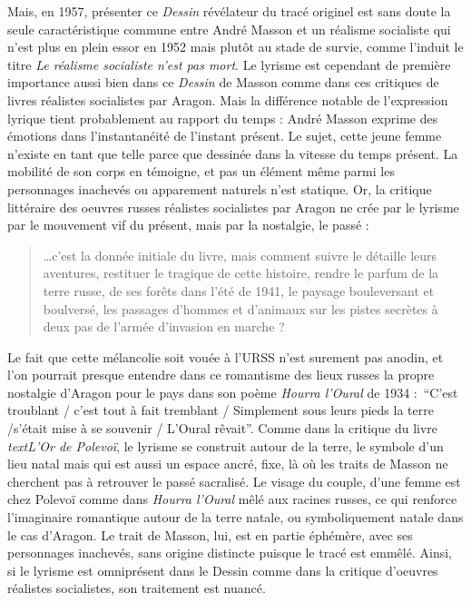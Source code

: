 	Mais, en 1957, présenter ce \emph{Dessin} révélateur du tracé originel est sans doute la seule caractéristique commune entre André Masson et un réalisme socialiste qui n’est plus en plein essor en 1952 mais plutôt au stade de survie, comme l’induit le titre \emph{Le réalisme socialiste n’est pas mort}. Le lyrisme est cependant de première importance aussi bien dans ce \emph{Dessin} de Masson comme dans ces critiques de livres réalistes socialistes par Aragon. Mais la différence notable de l’expression lyrique tient probablement au rapport du temps : André Masson exprime des émotions dans l’instantanéité de l’instant présent. Le sujet, cette jeune femme n’existe en tant que telle parce que dessinée dans la vitesse du temps présent. La mobilité de son corps en témoigne, et pas un élément même parmi les personnages inachevés ou apparement naturels n’est statique. Or, la critique littéraire des oeuvres russes réalistes socialistes par Aragon ne crée par le lyrisme par le mouvement vif du présent, mais par la nostalgie, le passé : 

\begin{quote}
…c’est la donnée initiale du livre, mais comment suivre le détaille leurs aventures, restituer le tragique de cette histoire, rendre le parfum de la terre russe, de ses forêts dans l’été de 1941, le paysage bouleversant et boulversé, les passages d’hommes et d’animaux sur les pistes secrètes à deux pas de l’armée d’invasion en marche ?  	
\end{quote}	


Le fait que cette mélancolie soit vouée à l’URSS n’est surement pas anodin, et l’on pourrait presque entendre dans ce romantisme des lieux russes la propre nostalgie d’Aragon pour le pays dans son poème \emph{Hourra l’Oural} de 1934 : \enquote{C’est troublant / c’est tout à fait tremblant / Simplement sous leurs pieds la terre /s’était mise à se souvenir / L’Oural rêvait}. Comme dans la critique du livre \emph{textL’Or de Polevoï}, le lyrisme se construit autour de la terre, le symbole d’un lieu natal mais qui est aussi un espace ancré, fixe, là où les traits de Masson ne cherchent pas à retrouver le passé sacralisé. Le visage du couple, d’une femme est chez Polevoï comme dans \emph{Hourra l’Oural} mêlé aux racines russes, ce qui renforce l’imaginaire romantique autour de la terre natale, ou symboliquement natale dans le cas d’Aragon. Le trait de Masson, lui, est en partie éphémère, avec ses personnages inachevés, sans origine distincte puisque le tracé est emmêlé. Ainsi, si le lyrisme est omniprésent dans le Dessin comme dans la critique d’oeuvres réalistes socialistes, son traitement est nuancé.

